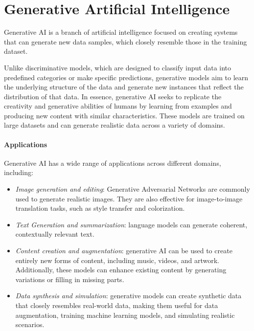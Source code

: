 \section{Generative Artificial Intelligence}

\begin{definition}
    Generative AI is a branch of artificial intelligence focused on creating systems that can generate new data samples, which closely resemble those in the training dataset.
\end{definition}
\noindent Unlike discriminative models, which are designed to classify input data into predefined categories or make specific predictions, generative models aim to learn the underlying structure of the data and generate new instances that reflect the distribution of that data.
In essence, generative AI seeks to replicate the creativity and generative abilities of humans by learning from examples and producing new content with similar characteristics.
These models are trained on large datasets and can generate realistic data across a variety of domains.

\paragraph*{Applications}
Generative AI has a wide range of applications across different domains, including:
\begin{itemize}
    \item \textit{Image generation and editing}: Generative Adversarial Networks are commonly used to generate realistic images. 
        They are also effective for image-to-image translation tasks, such as style transfer and colorization.
    \item \textit{Text Generation and summarization}: language models can generate coherent, contextually relevant text. 
    \item \textit{Content creation and augmentation}: generative AI can be used to create entirely new forms of content, including music, videos, and artwork. 
        Additionally, these models can enhance existing content by generating variations or filling in missing parts.
    \item \textit{Data synthesis and simulation}: generative models can create synthetic data that closely resembles real-world data, making them useful for data augmentation, training machine learning models, and simulating realistic scenarios. 
\end{itemize}

